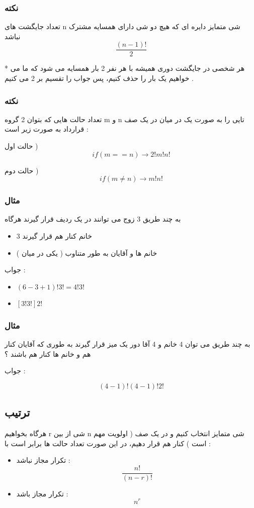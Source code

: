 \documentclass[12pt]{book}
\begin{document}
\subsubsection{نکته}

تعداد جایگشت های n شی متمایز دایره ای که هیچ دو شی دارای همسایه مشترک نباشد 
$$
\frac{(n-1)!}{2}
$$

* هر شخصی در جایگشت دوری همیشه با هر نفر 2 بار همسایه می شود که ما می خواهیم یک بار را حذف کنیم، پس جواب را تقسیم بر 2 می کنیم .

\subsubsection{نکته}
تعداد حالت هایی که بتوان 2 گروه m و n تایی را به صورت یک در میان در یک صف قرارداد به صورت زیر است :

حالت اول ) 
$$
if( m == n ) \to 2!m!n!
$$

حالت دوم )
$$
if( m \neq n ) \to m!n!
$$


\subsubsection{مثال}
به چند طریق 3 زوج می توانند در یک ردیف قرار گیرند هرگاه
\begin{itemize}
	\item 3 خانم کنار هم قرار گیرند
	\item خانم ها و آقایان به طور متناوب ( یکی در میان )
\end{itemize}

جواب :
\begin{itemize}
	\item $( 6-3+1 ) ! 3 ! = 4 ! 3 !$
	\item $[ 3 ! 3 ! ] 2 !$
\end{itemize}


\subsubsection{مثال}
به چند طریق می توان 4 خانم و 4 آقا دور یک میز قرار گیرند به طوری که آقایان کنار هم و خانم ها کنار هم باشند ؟

جواب :

$$
(4-1)!(4-1)!2!
$$



\subsection{ترتیب}
هرگاه بخواهیم r شی از بین n شی متمایز انتخاب کنیم و در یک صف ( اولویت مهم است ) کنار هم قرار دهیم، در این صورت تعداد حالت ها برابر است با :
\begin{itemize}
	\item تکرار مجاز نباشد :
	$$
	\frac{n!}{(n-r)!}
	$$
	\item تکرار مجاز باشد :
	$$
	n^{r}
	$$
\end{itemize}
\end{document}
